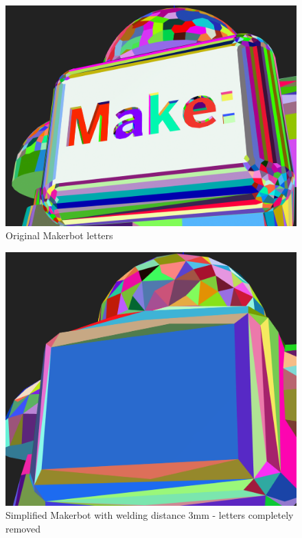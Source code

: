 \documentclass[../ClassicThesis.tex]{subfiles}
\begin{document}

\begin{figure}
\includegraphics[width=0.8\columnwidth]{Images/04-approx-welding-make-unwelded.png}
\caption{Original Makerbot letters}
\label{fig:origMakerbotMake}
\end{figure}

\begin{figure}
\includegraphics[width=0.8\columnwidth]{Images/04-approx-welding-make-3mm.png}
\caption{Simplified Makerbot with welding distance 3mm - letters completely removed}
\label{fig:3mmMakerbotMake}
\end{figure}
\end{document}
